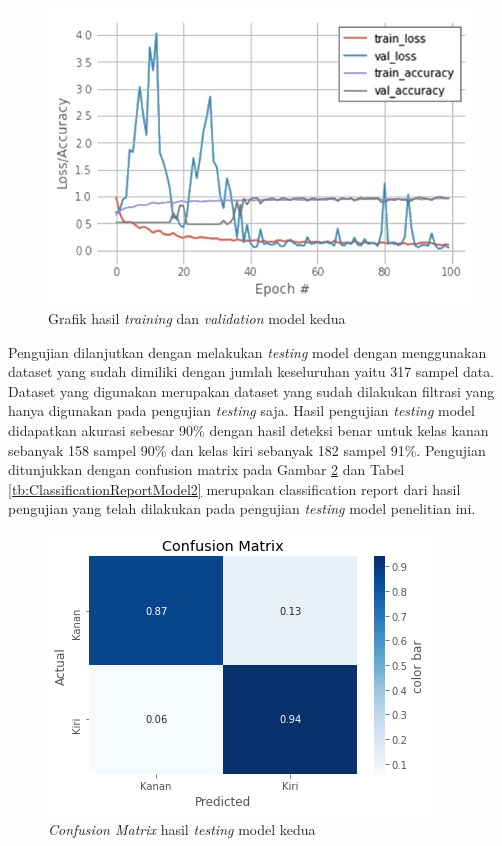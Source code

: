\begin{figure}[H]
  \centering
  \includegraphics[scale=0.75]{gambar/belakang w.jpg}
  \caption{Grafik hasil \emph{training} dan \emph{validation} model kedua}
  \label{fig:HasilTrainingValidationModel2}
\end{figure}

Pengujian dilanjutkan dengan melakukan \emph{testing} model dengan menggunakan dataset yang sudah dimiliki dengan jumlah keseluruhan yaitu 317 sampel data. Dataset yang digunakan merupakan dataset yang sudah dilakukan filtrasi yang hanya digunakan pada pengujian \emph{testing} saja. Hasil pengujian \emph{testing} model didapatkan akurasi sebesar 90\% dengan hasil deteksi benar untuk kelas kanan sebanyak 158 sampel 90\% dan kelas kiri sebanyak 182 sampel 91\%. Pengujian ditunjukkan dengan confusion matrix pada Gambar \ref{fig:HasilTestingModel2} dan Tabel \ref{tb:ClassificationReportModel2} merupakan classification report dari hasil pengujian yang telah dilakukan pada pengujian \emph{testing} model penelitian ini.

\begin{figure}[H]
  \centering
  \includegraphics[scale=0.98]{gambar/cm model belakang.png}
  \caption{\emph{Confusion Matrix} hasil \emph{testing} model kedua}
  \label{fig:HasilTestingModel2}
\end{figure}

